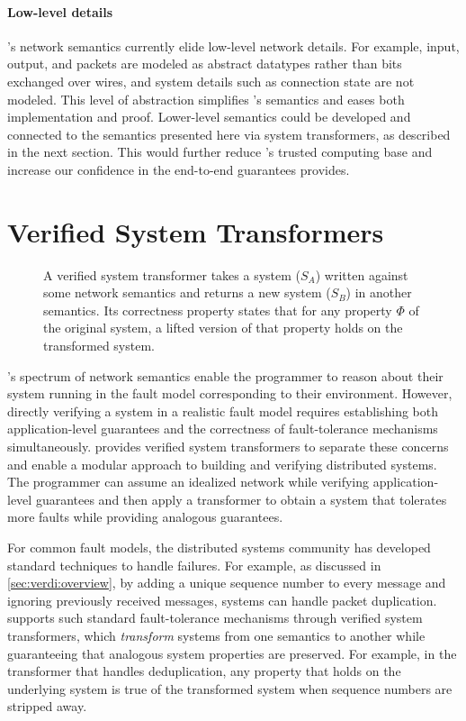 \paragraph{Low-level details}

\Verdi's network semantics currently elide low-level network details.
%
For example, input, output, and packets are modeled as abstract datatypes
rather than bits exchanged over wires, and system details such as
connection state are not modeled.
%
This level of abstraction simplifies \Verdi's semantics and eases both
implementation and proof.
%
Lower-level semantics could be developed and connected to the semantics
presented here via system transformers, as described in the next section.
%
This would further reduce \Verdi's trusted computing base and increase our
confidence in the end-to-end guarantees \Verdi provides.

\section{Verified System Transformers}
\label{sec:verdi:libraries}

\begin{figure}
  \centering
  
  \caption{A verified system transformer takes a system ($S_A$) written
    against some network semantics and returns a new system ($S_B$) in
    another semantics. Its correctness property states that for any
    property $\Phi$ of the original system, a lifted version of that
    property holds on the transformed system.}
  \label{fig:vst}
\end{figure}

\Verdi's spectrum of network semantics enable the programmer to reason
about their system running in the fault model corresponding to their
environment. However, directly verifying a system in a realistic fault
model requires establishing both application-level guarantees and the
correctness of fault-tolerance mechanisms simultaneously.  \Verdi
provides verified system transformers to separate these concerns and
enable a modular approach to building and verifying distributed
systems. The programmer can assume an idealized network while
verifying application-level guarantees and then apply a transformer to
obtain a system that tolerates more faults while providing analogous guarantees.

For common fault models, the distributed systems community has
developed standard techniques to handle failures. For example, as
discussed in \cref{sec:verdi:overview}, by adding a unique sequence
number to every message and ignoring previously received messages,
systems can handle packet duplication. \Verdi supports such
standard fault-tolerance mechanisms through verified system transformers,
which \emph{transform} systems from one semantics to another while
guaranteeing that analogous system properties are preserved. For
example, in the transformer that handles deduplication, any property
that holds on the underlying system is true of the transformed
system when sequence numbers are stripped away.

